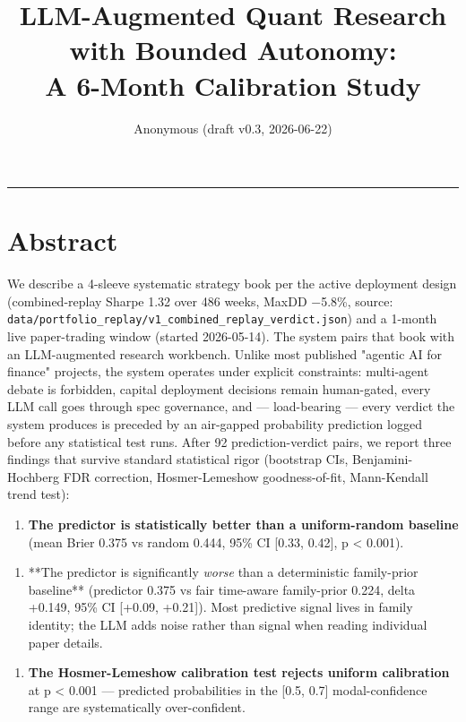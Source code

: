 \documentclass[11pt,a4paper]{article}
\title{LLM-Augmented Quant Research with Bounded Autonomy:\\
A 6-Month Calibration Study}
\author{Anonymous (draft v0.3, 2026-06-22)}
\date{}
\begin{document}
\maketitle



\medskip\hrule\medskip

\section{Abstract}

We describe a 4-sleeve systematic strategy book per the active deployment design (combined-replay Sharpe 1.32 over 486 weeks, MaxDD −5.8\%, source: \texttt{data/portfolio\_replay/v1\_combined\_replay\_verdict.json}) and a 1-month live paper-trading window (started 2026-05-14). The system pairs that book with an LLM-augmented research workbench. Unlike most published "agentic AI for finance" projects, the system operates under explicit constraints: multi-agent debate is forbidden, capital deployment decisions remain human-gated, every LLM call goes through spec governance, and — load-bearing — every verdict the system produces is preceded by an air-gapped probability prediction logged before any statistical test runs. After 92 prediction-verdict pairs, we report three findings that survive standard statistical rigor (bootstrap CIs, Benjamini-Hochberg FDR correction, Hosmer-Lemeshow goodness-of-fit, Mann-Kendall trend test):

\begin{enumerate}[leftmargin=*]
\item \textbf{The predictor is statistically better than a uniform-random baseline} (mean Brier 0.375 vs random 0.444, 95\% CI [0.33, 0.42], p < 0.001).
\end{enumerate}

\begin{enumerate}[leftmargin=*]
\item **The predictor is significantly \textit{worse} than a deterministic family-prior baseline** (predictor 0.375 vs fair time-aware family-prior 0.224, delta +0.149, 95\% CI [+0.09, +0.21]). Most predictive signal lives in family identity; the LLM adds noise rather than signal when reading individual paper details.
\end{enumerate}

\begin{enumerate}[leftmargin=*]
\item \textbf{The Hosmer-Lemeshow calibration test rejects uniform calibration} at p < 0.001 — predicted probabilities in the [0.5, 0.7] modal-confidence range are systematically over-confident.
\end{enumerate}
\end{document}
